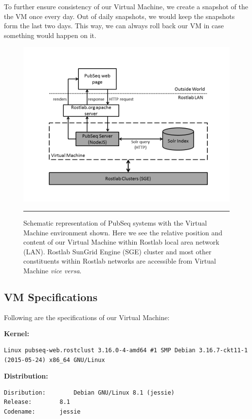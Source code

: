 To further ensure consistency of our Virtual Machine, we create a snapshot of the the VM once every day. Out of daily snapshots, we would keep the snapshots form the last two days. This way, we can always roll back our VM in case something would happen on it.

\begin{figure}[htbp]
    \includegraphics[width=6in]{Figures/pubseq_vm.png}
    \rule{35em}{0.5pt}
  \caption[Schematic representation of PubSeq systems with the Virtual Machine environment shown.]{Schematic representation of PubSeq systems with the Virtual Machine environment shown. Here we see the relative position and content of our Virtual Machine within Rostlab local area network (LAN). Rostlab SunGrid Engine (SGE) cluster and most other constituents within Rostlab networks are accessible from Virtual Machine \textit{vice versa}.}
  \label{fig:PubSeqVM}
\end{figure}

\subsection{VM Specifications}

Following are the specifications of our Virtual Machine:

\textbf{Kernel:}

\begin{lstlisting}[breaklines]
Linux pubseq-web.rostclust 3.16.0-4-amd64 #1 SMP Debian 3.16.7-ckt11-1 (2015-05-24) x86_64 GNU/Linux
\end{lstlisting}

\textbf{Distribution:}
\begin{lstlisting}[breaklines]
Disribution:		Debian GNU/Linux 8.1 (jessie)
Release:		8.1
Codename:		jessie
\end{lstlisting}



